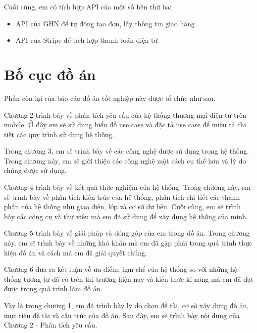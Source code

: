 \documentclass[../DoAn.tex]{subfiles}
\begin{document}
Cuối cùng, em có tích hợp API của một số bên thứ ba:

\begin{itemize}
\renewcommand\labelitemi{\textbullet}
\item API của GHN để tự động tạo đơn, lấy thông tin giao hàng
\item API của Stripe để tích hợp thanh toán điện tử
\end{itemize}
\section{Bố cục đồ án}
\label{section:1.4}
Phần còn lại của báo cáo đồ án tốt nghiệp này được tổ chức như sau. 

Chương 2 trình bày về phân tích yêu cầu của hệ thống thương mại điện tử trên mobile. Ở đây em sẽ sử dụng biểu đồ use case và đặc tả use case để miêu tả chi tiết các quy trình sử dụng hệ thống.

Trong chương 3, em sẽ trình bày về các công nghệ được sử dụng trong hệ thống. Trong chương này, em sẽ giới thiệu các công nghệ một cách cụ thể hơn và lý do chúng được sử dụng.


Chương 4 trình bày về kết quả thực nghiệm của hệ thống. Trong chương này, em sẽ trình bày về phân tích kiến trúc của hê thống, phân tích chi tiết các thành phần của hệ thống như giao diện, lớp và cơ sở dữ liệu. Cuối cùng, em sẽ trình bày các công cụ và thư viện mà em đã sử dụng để xây dụng hệ thống của mình.


Chương 5 trình bày về giải pháp và đóng góp của em trong đồ án. Trong chương này, em sẽ trình bày về những khó khăn mà em đã gặp phải trong quá trình thực hiện đồ án và cách mà em đã giải quyết chúng.

Chương 6 đưa ra kết luận về ưu điểm, hạn chế của hệ thống so với những hệ thống tương tự đã có trên thị trường hiện nay và kiến thức kĩ năng mà em đã đạt được trong quá trình làm đồ án.


Vậy là trong chương 1, em đã trình bày lý do chọn đề tài, cơ sở xây dựng đồ án, mục tiêu đề tài và cấu trúc của đồ án. Sau đây, em sẽ trình bày nội dung của Chương 2 - Phân tích yêu cầu.



\end{document}
